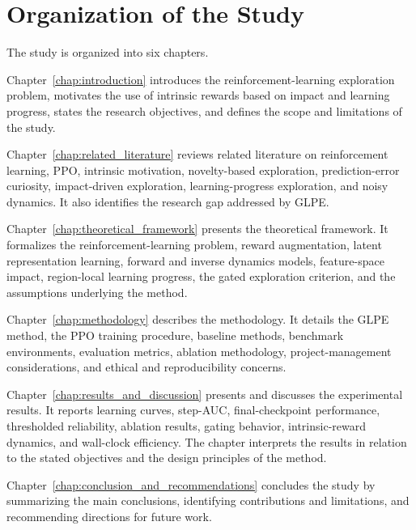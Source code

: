 \section{Organization of the Study}
\label{sec:organization_of_the_study}

The study is organized into six chapters.

Chapter~\ref{chap:introduction} introduces the reinforcement-learning exploration problem, motivates the use of intrinsic rewards based on impact and learning progress, states the research objectives, and defines the scope and limitations of the study.

Chapter~\ref{chap:related_literature} reviews related literature on reinforcement learning, PPO, intrinsic motivation, novelty-based exploration, prediction-error curiosity, impact-driven exploration, learning-progress exploration, and noisy dynamics.
It also identifies the research gap addressed by GLPE.

Chapter~\ref{chap:theoretical_framework} presents the theoretical framework.
It formalizes the reinforcement-learning problem, reward augmentation, latent representation learning, forward and inverse dynamics models, feature-space impact, region-local learning progress, the gated exploration criterion, and the assumptions underlying the method.

Chapter~\ref{chap:methodology} describes the methodology.
It details the GLPE method, the PPO training procedure, baseline methods, benchmark environments, evaluation metrics, ablation methodology, project-management considerations, and ethical and reproducibility concerns.

Chapter~\ref{chap:results_and_discussion} presents and discusses the experimental results.
It reports learning curves, step-AUC, final-checkpoint performance, thresholded reliability, ablation results, gating behavior, intrinsic-reward dynamics, and wall-clock efficiency.
The chapter interprets the results in relation to the stated objectives and the design principles of the method.

Chapter~\ref{chap:conclusion_and_recommendations} concludes the study by summarizing the main conclusions, identifying contributions and limitations, and recommending directions for future work.